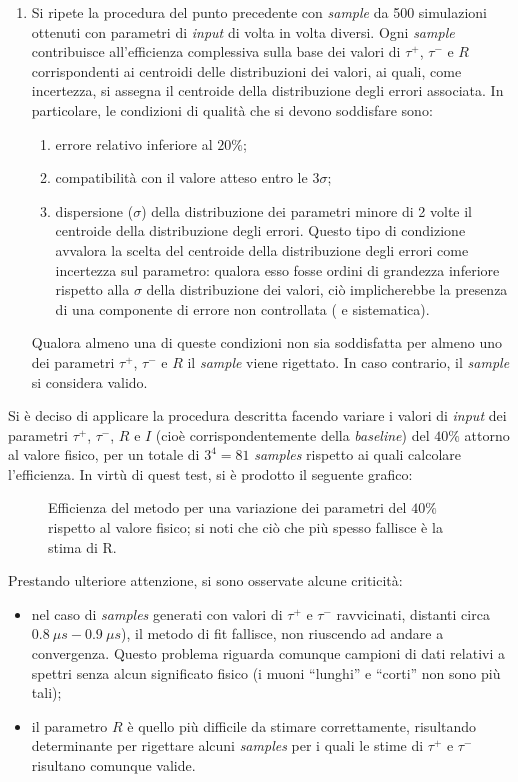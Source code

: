 \documentclass[10pt, oneside, a4paper]{article}   	%
\begin{document}
\begin{enumerate}
 \item Si ripete la procedura del punto precedente con \textit{sample} da 500 simulazioni ottenuti con parametri di \textit{input} di volta in volta diversi. Ogni \textit{sample} contribuisce all'efficienza complessiva sulla base dei valori di $\tau^+$, $\tau^-$ e $R$ corrispondenti ai centroidi delle distribuzioni dei valori, ai quali, come incertezza, si assegna il centroide della distribuzione degli errori associata. In particolare, le condizioni di qualità che si devono soddisfare sono:  
 \begin{enumerate}
  \item errore relativo inferiore al $20\%$;
  \item compatibilità con il valore atteso entro le $3\sigma$;
  \item dispersione ($\sigma$) della distribuzione dei parametri minore di 2 volte il centroide della distribuzione degli errori. Questo tipo di condizione avvalora la scelta del centroide della distribuzione degli errori come incertezza sul parametro: qualora esso fosse ordini di grandezza inferiore rispetto alla $\sigma$ della distribuzione dei valori, ciò implicherebbe la presenza di una componente di errore non controllata ( e sistematica).  
 \end{enumerate}
Qualora almeno una di queste condizioni non sia soddisfatta per almeno uno dei parametri $\tau^+$, $\tau^-$ e $R$ il \textit{sample} viene rigettato. In caso contrario, il \textit{sample} si considera valido. 
\end{enumerate}
Si è deciso di applicare la procedura descritta facendo variare i valori di \textit{input} dei parametri $\tau^+$, $\tau^-$, $R$ e $I$ (cioè corrispondentemente della \textit{baseline}) del $40\%$ attorno al valore fisico, per un totale di $3^4=81$ \textit{samples} rispetto ai quali calcolare l'efficienza. In virtù di quest test, si è prodotto il seguente grafico:
%
\begin{figure}[H]
  \centering
  
  \caption{Efficienza del metodo per una variazione dei parametri del $40\%$ rispetto al valore fisico; si noti che ciò che più spesso fallisce è la stima di R.}
  \label{fig:finale}
\end{figure}
%
Prestando ulteriore attenzione, si sono osservate alcune criticità:
\begin{itemize}
 \item nel caso di \textit{samples} generati con valori di $\tau^+$ e $\tau^-$ ravvicinati, distanti circa $0.8 \ \mu s - 0.9 \ \mu s$), il metodo di fit fallisce, non riuscendo ad andare a convergenza. Questo problema riguarda comunque campioni di dati relativi a spettri senza alcun significato fisico (i muoni ``lunghi'' e ``corti'' non sono più tali);
 \item il parametro $R$ è quello più difficile da stimare correttamente, risultando determinante per rigettare alcuni \textit{samples} per i quali le stime di $\tau^+$ e $\tau^-$ risultano comunque valide.  
\end{itemize}
\end{document}
